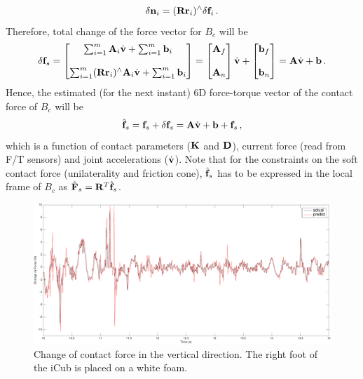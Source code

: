 %
\begin{equation}
  \delta \mathbf{n}_i = (\mathbf{R} \mathbf{r}_i)^{\wedge} \delta \mathbf{f}_i \, .
\end{equation}
%
Therefore, total change of the force vector for $B_c$ will be
%
\begin{equation}
  \delta \mathbf{f}_s =
  \begin{bmatrix}
    \sum_{i=1}^m \mathbf{A}_i \dot{\mathbf{v}} + \sum_{i=1}^m \mathbf{b}_i\\
    \\
    \sum_{i=1}^m (\mathbf{R} \mathbf{r}_i)^{\wedge} \mathbf{A}_i \dot{\mathbf{v}} + \sum_{i=1}^m \mathbf{b}_i
  \end{bmatrix}
  =
  \begin{bmatrix}
    \mathbf{A}_f \\
    \\
    \mathbf{A}_n
  \end{bmatrix}
  \dot{\mathbf{v}} +
  \begin{bmatrix}
    \mathbf{b}_f \\
    \\
    \mathbf{b}_n
  \end{bmatrix}
  = \mathbf{A} \dot{\mathbf{v}} + \mathbf{b} \, .
\end{equation}
%
Hence, the estimated (for the next instant) 6D force-torque vector of the
contact force of $B_c$ will be
%
\begin{equation}
  \hat{\mathbf{f}}_s = \mathbf{f}_s + \delta \mathbf{f}_s = \mathbf{A} \dot{\mathbf{v}} + \mathbf{b} + \mathbf{f}_s \, ,
\end{equation}
%
which is a function of contact parameters ($\mathbf{K}$ and $\mathbf{D}$), current force
(read from F/T sensors) and joint accelerations ($\dot{\mathbf{v}}$).  Note that for
the constraints on the soft contact force (unilaterality and friction cone),
$\hat{\mathbf{f}}_s$ has to be expressed in the local frame of $B_c$ as $\hat{\mathbf{F}}_s
= \mathbf{R}^T \hat{\mathbf{f}}_s$.
\begin{figure}
  \centering
  \includegraphics[scale=0.4]{images/force_estimate.pdf}
  \caption{Change of contact force in the vertical direction.  The right foot
    of the iCub is placed on a white foam.}
  \label{force_estimate}
\end{figure}
